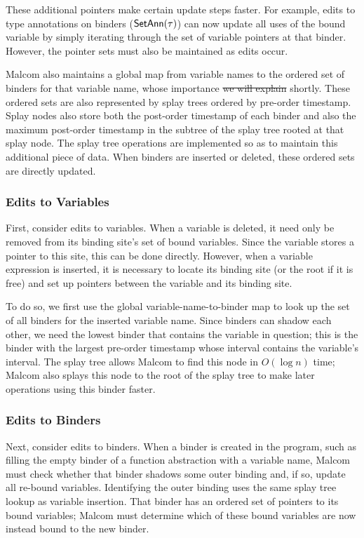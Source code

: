\documentclass[acmsmall,dvipsnames,10pt,nonacm]{acmart}\settopmatter{printfolios=true} %
\makeatletter
\newcommand{\SetAnn}[1]{{\normalfont\textsf{SetAnn}}(#1)}
\providecommand{\DIFadd}[1]{{\protect\color{blue}\uwave{#1}}} %
\providecommand{\DIFdel}[1]{{\protect\color{red}\sout{#1}}} %
\providecommand{\DIFaddbegin}{} %
\providecommand{\DIFaddend}{} %
\providecommand{\DIFdelbegin}{} %
\providecommand{\DIFdelend}{} %
\newcommand{\DIFscaledelfig}{0.5}
\newlength{\DIFdelgraphicswidth} %
\newlength{\DIFdelgraphicsheight} %
\newcommand{\DIFaddincludegraphics}[2][]{{\color{blue}\fbox{\DIFOincludegraphics[#1]{#2}}}} %
\newcommand{\DIFdelincludegraphics}[2][]{%
\sbox{\DIFdelgraphicsbox}{\DIFOincludegraphics[#1]{#2}}%
\settoboxwidth{\DIFdelgraphicswidth}{\DIFdelgraphicsbox} %
\settoboxtotalheight{\DIFdelgraphicsheight}{\DIFdelgraphicsbox} %
\scalebox{\DIFscaledelfig}{%
\parbox[b]{\DIFdelgraphicswidth}{\usebox{\DIFdelgraphicsbox}\\[-\baselineskip] \rule{\DIFdelgraphicswidth}{0em}}\llap{\resizebox{\DIFdelgraphicswidth}{\DIFdelgraphicsheight}{%
\setlength{\unitlength}{\DIFdelgraphicswidth}%
\begin{picture}(1,1)%
\thicklines\linethickness{2pt} %
{\color[rgb]{1,0,0}\put(0,0){\framebox(1,1){}}}%
{\color[rgb]{1,0,0}\put(0,0){\line( 1,1){1}}}%
{\color[rgb]{1,0,0}\put(0,1){\line(1,-1){1}}}%
\end{picture}%
}\hspace*{3pt}}} %
} %
\DeclareRobustCommand{\DIFaddbegin}{\DIFOaddbegin \let\includegraphics\DIFaddincludegraphics} %
\DeclareRobustCommand{\DIFaddend}{\DIFOaddend \let\includegraphics\DIFOincludegraphics} %
\DeclareRobustCommand{\DIFdelbegin}{\DIFOdelbegin \let\includegraphics\DIFdelincludegraphics} %
\DeclareRobustCommand{\DIFdelend}{\DIFOaddend \let\includegraphics\DIFOincludegraphics} %
\let\sout@orig\sout %
\renewcommand{\sout}[1]{\ifmmode\text{\sout@orig{\ensuremath{#1}}}\else\sout@orig{#1}\fi} %
\makeatother
\begin{document}
These additional pointers make certain update steps faster. For example, edits to type annotations on binders ($\SetAnn{\tau}$) can now update all uses of the bound variable by simply iterating through the set of variable pointers at that binder. However, the pointer sets must also be maintained as edits occur.

Malcom also maintains a global map from variable names to the ordered set of binders for that variable name, whose importance \DIFdelbegin \DIFdel{we will explain }\DIFdelend \DIFaddbegin \DIFadd{will be explained }\DIFaddend shortly. These ordered sets are also represented by splay trees ordered by pre-order timestamp. Splay nodes also store both the post-order timestamp of each binder and also the maximum post-order timestamp in the subtree of the splay tree rooted at that splay node. The splay tree operations are implemented so as to maintain this additional piece of data. When binders are inserted or deleted, these ordered sets are directly updated.

\subsubsection{Edits to Variables}

First, consider edits to variables.
When a variable is deleted, it need only be removed from its binding site's set of bound variables. Since the variable stores a pointer to this site, this can be done directly. However, when a variable expression is inserted, it is necessary to locate its binding site (or the root if it is free) and set up pointers between the variable and its binding site. 

To do so, we first use the global variable-name-to-binder map to look up the set of all binders for the inserted variable name. Since binders can shadow each other, we need the lowest binder that contains the variable in question; this is the binder with the largest pre-order timestamp whose interval contains the variable's interval. The splay tree allows Malcom to find this node in $O(\log n)$ time; Malcom also splays this node to the root of the splay tree to make later operations using this binder faster.

\subsubsection{Edits to Binders}

Next, consider edits to binders.
When a binder is created in the program, such as filling the empty binder of a function abstraction with a variable name,
Malcom must check whether that binder shadows some outer binding and, if so, update all re-bound variables. Identifying the outer binding uses the same splay tree lookup as variable insertion. That binder has an ordered set of pointers to its bound variables; Malcom must determine which of these bound variables are now instead bound to the new binder.
\end{document}
